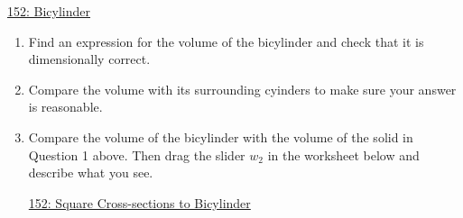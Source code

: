 \documentclass{ximera}
\begin{document}
\begin{onlineOnly}
    \begin{center}
\end{center}
\end{onlineOnly}

\href{https://www.desmos.com/3d/wzzhod4ya6}{152: Bicylinder}

\begin{enumerate}
\item Find an expression for the volume of the bicylinder and check that it is dimensionally correct.

\item Compare the volume with its surrounding cyinders to make sure your answer is reasonable.

\item Compare the volume of the bicylinder with the volume of the solid in Question 1 above. Then drag the slider $w_2$ in the worksheet below and describe what you see.

\begin{onlineOnly}
    \begin{center}
\end{center}
\end{onlineOnly}

\href{https://www.desmos.com/3d/cwcjqkjndw}{152: Square Cross-sections to Bicylinder}





\end{enumerate}
\end{document}
